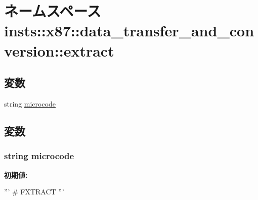 \hypertarget{namespaceinsts_1_1x87_1_1data__transfer__and__conversion_1_1extract}{
\section{ネームスペース insts::x87::data\_\-transfer\_\-and\_\-conversion::extract}
\label{namespaceinsts_1_1x87_1_1data__transfer__and__conversion_1_1extract}
}
\subsection*{変数}
\begin{DoxyCompactItemize}
\item 
string \hyperlink{namespaceinsts_1_1x87_1_1data__transfer__and__conversion_1_1extract_a770f11a173e99389a8802f0107ed8f52}{microcode}
\end{DoxyCompactItemize}


\subsection{変数}
\hypertarget{namespaceinsts_1_1x87_1_1data__transfer__and__conversion_1_1extract_a770f11a173e99389a8802f0107ed8f52}{
\subsubsection[{microcode}]{\setlength{\rightskip}{0pt plus 5cm}string {\bf microcode}}}
\label{namespaceinsts_1_1x87_1_1data__transfer__and__conversion_1_1extract_a770f11a173e99389a8802f0107ed8f52}
{\bfseries 初期値:}
\begin{DoxyCode}
'''
# FXTRACT
'''
\end{DoxyCode}
